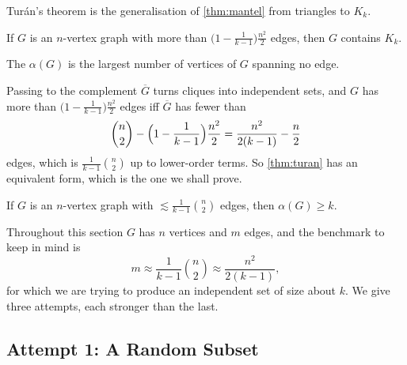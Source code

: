 Tur\'an's theorem is the generalisation of \autoref{thm:mantel} from triangles to \(K_k\).

\begin{theorem}[Tur\'an, 1941]\label{thm:turan}
    If \(G\) is an \(n\)-vertex graph with more than \(\bigl( 1 - \frac{1}{k-1} \bigr) \frac{n^2}{2}\) edges, then \(G\) contains \(K_k\).
\end{theorem}

\begin{definition}\label{def:independence}
    The  \(\alpha(G)\) is the largest number of vertices of \(G\) spanning no edge.
\end{definition}

Passing to the complement \(\overline{G}\) turns cliques into independent sets, and \(G\) has more than \(\bigl( 1 - \frac{1}{k-1} \bigr) \frac{n^2}{2}\) edges iff \(\overline{G}\) has fewer than
\[
    \binom{n}{2} - \Bigl( 1 - \frac{1}{k-1} \Bigr) \frac{n^2}{2} = \frac{n^2}{2(k-1)} - \frac{n}{2}
\]
edges, which is \(\frac{1}{k-1} \binom{n}{2}\) up to lower-order terms. So \autoref{thm:turan} has an equivalent form, which is the one we shall prove.

\begin{theorem}\label{thm:turan-complement}
    If \(G\) is an \(n\)-vertex graph with \(\lesssim \frac{1}{k-1} \binom{n}{2}\) edges, then \(\alpha(G) \ge k\).
\end{theorem}

Throughout this section \(G\) has \(n\) vertices and \(m\) edges, and the benchmark to keep in mind is
\[
    m \approx \frac{1}{k-1} \binom{n}{2} \approx \frac{n^2}{2(k-1)},
\]
for which we are trying to produce an independent set of size about \(k\). We give three attempts, each stronger than the last.

\subsection{Attempt 1: A Random Subset}

